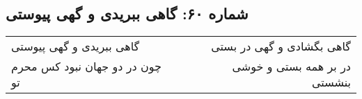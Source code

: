 \begin{center}
\section*{شماره ۶۰: گاهی ببریدی و گهی پیوستی}
\label{sec:060}
\begin{longtable}{l p{0.5cm} r}
گاهی ببریدی و گهی پیوستی
&&
گاهی بگشادی و گهی در بستی
\\
چون در دو جهان نبود کس محرم تو
&&
در بر همه بستی و خوشی بنشستی
\\
\end{longtable}
\end{center}
